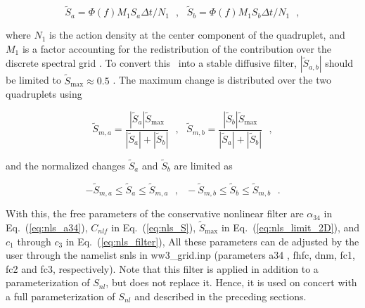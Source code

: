\begin{equation}
\tilde{S}_a = \Phi(f) M_1 S_a \Delta t / N_1
\:\:\: , \:\:\:
\tilde{S}_b = \Phi(f) M_1 S_b \Delta t / N_1
\:\:\: , \label{eq:nls_tilde_s}
\end{equation}

\noindent 
where $N_1$ is the action density at the center component of the quadruplet,
and $M_1$ is a factor accounting for the redistribution of the contribution
over the discrete spectral grid \citep[for details, see][]{tol:OMOD11}. To
convert this \dia\ into a stable diffusive filter, $|\tilde{S}_{a,b}|$ should
be limited to $\tilde{S}_{\max} \approx 0.5$ \citep[e.g.,][]{bk:Fle88}. The
maximum change is distributed over the two quadruplets using

\begin{equation}
\tilde{S}_{m,a} = 
   \frac{|\tilde{S}_a|\tilde{S}_{\max}}{|\tilde{S}_a|+|\tilde{S}_b|}
 \:\:\: , \:\:\:
\tilde{S}_{m,b} = 
   \frac{|\tilde{S}_b|\tilde{S}_{\max}}{|\tilde{S}_a|+|\tilde{S}_b|}
\:\:\: ,
\label{eq:nls_limit_2D}
\end{equation}

\noindent
and the normalized changes $\tilde{S}_a$ and $\tilde{S}_b$ are limited as

\begin{equation}
- \tilde{S}_{m,a} \leq \tilde{S}_a \leq \tilde{S}_{m,a} \:\:\: , \:\:\:
- \tilde{S}_{m,b} \leq \tilde{S}_b \leq \tilde{S}_{m,b} \:\:\: .
\label{eq:nls_limit}
\end{equation}

\noindent 
With this, the free parameters of the conservative nonlinear filter are
$\alpha_{34}$ in Eq.~(\ref{eq:nls_a34}), $C_{nlf}$ in Eq.~(\ref{eq:nls_S}),
$\tilde{S}_{\max}$ in Eq.~(\ref{eq:nls_limit_2D}), and $c_1$ through $c_3$ in
Eq.~(\ref{eq:nls_filter}), All these parameters can de adjusted by the user
through the namelist {\F snls} in {\file ww3\_grid.inp} (parameters {\F a34} ,
{\F fhfc}, {\F dnm}, {\F fc1}, {\F fc2} and {\F fc3}, respectively).  Note
that this filter is applied in addition to a parameterization of $S_{nl}$, but
does not replace it. Hence, it is used on concert with a full parameterization
of $S_{nl}$ and described in the preceding sections.